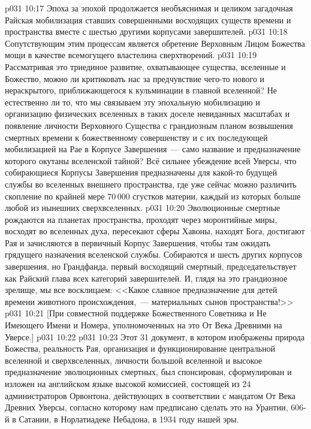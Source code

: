 \vs p031 10:17 Эпоха за эпохой продолжается необъяснимая и целиком загадочная Райская мобилизация ставших совершенными восходящих существ времени и пространства вместе с шестью другими корпусами завершителей.
\vs p031 10:18 Сопутствующим этим процессам является обретение Верховным Лицом Божества мощи в качестве всемогущего властелина сверхтворений.
\vs p031 10:19 \pc Рассматривая это триединое развитие, охватывающее существа, вселенные и Божество, можно ли критиковать нас за предчувствие чего\hyp{}то нового и нераскрытого, приближающегося к кульминации в главной вселенной? Не естественно ли то, что мы связываем эту эпохальную мобилизацию и организацию физических вселенных в таких доселе невиданных масштабах и появление личности Верховного Существа с грандиозным планом возвышения смертных времени к божественному совершенству и с их последующей мобилизацией на Рае в Корпусе Завершения~--- само название и предназначение которого окутаны вселенской тайной? Всё сильнее убеждение всей Уверсы, что собирающиеся Корпусы Завершения предназначены для какой\hyp{}то будущей службы во вселенных внешнего пространства, где уже сейчас можно различить скопление по крайней мере 70\,000 сгустков материи, каждый из которых больше любой из нынешних сверхвселенных.
\vs p031 10:20 \pc Эволюционные смертные рождаются на планетах пространства, проходят через моронтийные миры, восходят во вселенных духа, пересекают сферы Хавоны, находят Бога, достигают Рая и зачисляются в первичный Корпус Завершения, чтобы там ожидать грядущего назначения вселенской службы. Собираются и шесть других корпусов завершения, но Грандфанда, первый восходящий смертный, председательствует как Райский глава всех категорий завершителей. И, глядя на это грандиозное зрелище, мы все восклицаем: <<Какое славное предназначение для детей времени животного происхождения,~--- материальных сынов пространства!>>
\vsetoff
\vs p031 10:21 [При совместной поддержке Божественного Советника и Не Имеющего Имени и Номера, уполномоченных на это От Века Древними на Уверсе.]
\vs p031 10:22 \separatorline
\vs p031 10:23 Этот 31 документ, в котором изображены природа Божества, реальность Рая, организация и функционирование центральной вселенной и сверхвселенных, личности большой вселенной и высокое предназначение эволюционных смертных, был спонсирован, сформулирован и изложен на английском языке высокой комиссией, состоящей из 24 администраторов Орвонтона, действующих в соответствии с мандатом От Века Древних Уверсы, согласно которому нам предписано сделать это на Урантии, 606\hyp{}й в Сатании, в Норлатиадеке Небадона, в 1934 году нашей эры.
\quizlink
